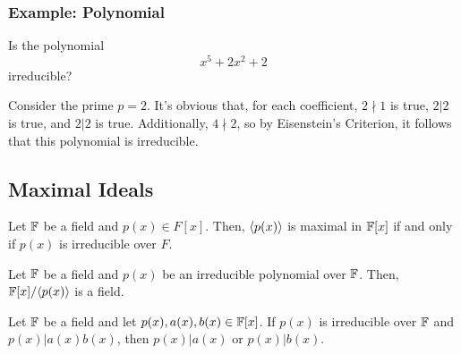 \documentclass[letterpaper]{article}
\begin{document}
\subsubsection{Example: Polynomial}
Is the polynomial
\[x^5 + 2x^2 + 2\]
irreducible?

\begin{mdframed}[]
    Consider the prime $p = 2$. It's obvious that, for each coefficient, $2 \nmid 1$ is true, $2 | 2$ is true, and $2 | 2$ is true. Additionally, $4 \nmid 2$, so by Eisenstein's Criterion, it follows that this polynomial is irreducible.
\end{mdframed}

\subsection{Maximal Ideals}
\begin{theorem}{}{}
    Let $\mathbb{F}$ be a field and $p(x) \in F[x]$. Then, $\langle p(x) \rangle$ is maximal in $\mathbb{F}[x]$ if and only if $p(x)$ is irreducible over $F$. 
\end{theorem}

\begin{theorem}{}{}
    Let $\mathbb{F}$ be a field and $p(x)$ be an irreducible polynomial over $\mathbb{F}$. Then, $\mathbb{F}[x] / \langle p(x) \rangle$ is a field. 
\end{theorem}

\begin{corollary}{}{}
    Let $\mathbb{F}$ be a field and let $p(x), a(x), b(x) \in \mathbb{F}[x]$. If $p(x)$ is irreducible over $\mathbb{F}$ and $p(x) | a(x) b(x)$, then $p(x) | a(x)$ or $p(x) | b(x)$. 
\end{corollary}
\end{document}
